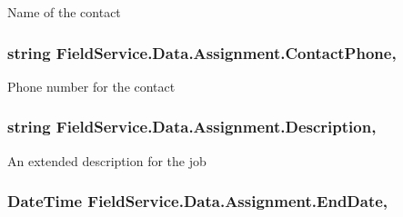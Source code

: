 Name of the contact 

\hypertarget{class_field_service_1_1_data_1_1_assignment_af35effb86cc44cbea2ede60fd2b879e2}{
\subsubsection[{Contact\+Phone}]{\setlength{\rightskip}{0pt plus 5cm}string Field\+Service.\+Data.\+Assignment.\+Contact\+Phone\hspace{0.3cm}{\ttfamily [get]}, {\ttfamily [set]}}}\label{class_field_service_1_1_data_1_1_assignment_af35effb86cc44cbea2ede60fd2b879e2}


Phone number for the contact 

\hypertarget{class_field_service_1_1_data_1_1_assignment_a8c1fbaa2a0f8a1d736cdccd5671345a2}{
\subsubsection[{Description}]{\setlength{\rightskip}{0pt plus 5cm}string Field\+Service.\+Data.\+Assignment.\+Description\hspace{0.3cm}{\ttfamily [get]}, {\ttfamily [set]}}}\label{class_field_service_1_1_data_1_1_assignment_a8c1fbaa2a0f8a1d736cdccd5671345a2}


An extended description for the job 

\hypertarget{class_field_service_1_1_data_1_1_assignment_a20fd1a8457f8294f8b54a80477efd32b}{
\subsubsection[{End\+Date}]{\setlength{\rightskip}{0pt plus 5cm}Date\+Time Field\+Service.\+Data.\+Assignment.\+End\+Date\hspace{0.3cm}{\ttfamily [get]}, {\ttfamily [set]}}}\label{class_field_service_1_1_data_1_1_assignment_a20fd1a8457f8294f8b54a80477efd32b}



